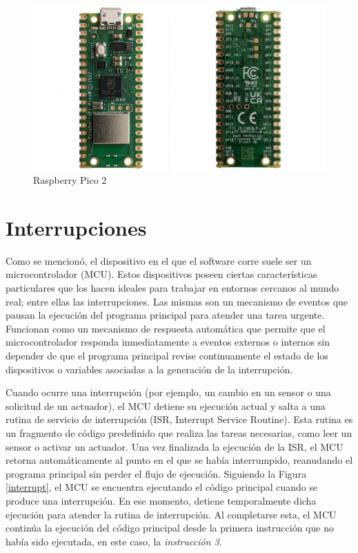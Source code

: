 \begin{figure}[h!]
	\caption{Raspberry Pico 2}
	\label{raspberry}
	\centering
    \includegraphics[width=0.6\linewidth]{raspberry_pico2.jpg}
\end{figure}


\section{Interrupciones}
Como se mencionó, el dispositivo en el que el software corre suele ser un microcontrolador (\gls{MCU}). Estos dispositivos poseen ciertas características particulares que los hacen ideales para trabajar en entornos cercanos al mundo real; entre ellas las interrupciones. Las mismas son un mecanismo de eventos que pausan la ejecución del programa principal para atender una tarea urgente. Funcionan como un mecanismo de respuesta automática que permite que el microcontrolador responda inmediatamente a eventos externos o internos sin depender de que el programa principal revise continuamente el estado de los dispositivos o variables asociadas a la generación de la interrupción.

Cuando ocurre una interrupción (por ejemplo, un cambio en un sensor o una solicitud de un actuador), el \gls{MCU} detiene su ejecución actual y salta a una rutina de servicio de interrupción (ISR, Interrupt Service Routine). Esta rutina es un fragmento de código predefinido que realiza las tareas necesarias, como leer un sensor o activar un actuador. Una vez finalizada la ejecución de la ISR, el \gls{MCU} retorna automáticamente al punto en el que se había interrumpido, reanudando el programa principal sin perder el flujo de ejecución. Siguiendo la Figura \ref{interrupt}, el \gls{MCU} se encuentra ejecutando el código principal cuando se produce una interrupción. En ese momento, detiene temporalmente dicha ejecución para atender la rutina de interrupción. Al completarse esta, el \gls{MCU} continúa la ejecución del código principal desde la primera instrucción que no había sido ejecutada, en este caso, la \textit{instrucción 3}.

